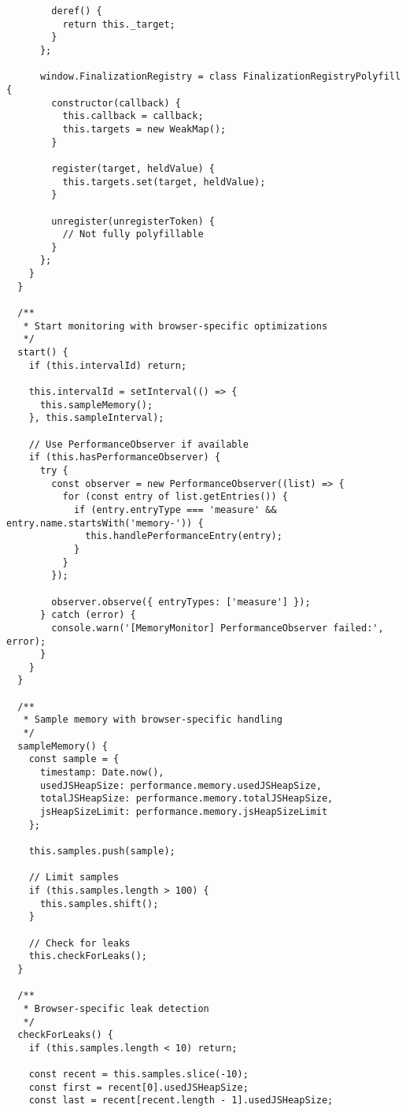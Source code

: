 \documentclass[11pt]{article}
\begin{document}
\begin{verbatim}
        deref() {
          return this._target;
        }
      };
      
      window.FinalizationRegistry = class FinalizationRegistryPolyfill {
        constructor(callback) {
          this.callback = callback;
          this.targets = new WeakMap();
        }
        
        register(target, heldValue) {
          this.targets.set(target, heldValue);
        }
        
        unregister(unregisterToken) {
          // Not fully polyfillable
        }
      };
    }
  }
  
  /**
   * Start monitoring with browser-specific optimizations
   */
  start() {
    if (this.intervalId) return;
    
    this.intervalId = setInterval(() => {
      this.sampleMemory();
    }, this.sampleInterval);
    
    // Use PerformanceObserver if available
    if (this.hasPerformanceObserver) {
      try {
        const observer = new PerformanceObserver((list) => {
          for (const entry of list.getEntries()) {
            if (entry.entryType === 'measure' && entry.name.startsWith('memory-')) {
              this.handlePerformanceEntry(entry);
            }
          }
        });
        
        observer.observe({ entryTypes: ['measure'] });
      } catch (error) {
        console.warn('[MemoryMonitor] PerformanceObserver failed:', error);
      }
    }
  }
  
  /**
   * Sample memory with browser-specific handling
   */
  sampleMemory() {
    const sample = {
      timestamp: Date.now(),
      usedJSHeapSize: performance.memory.usedJSHeapSize,
      totalJSHeapSize: performance.memory.totalJSHeapSize,
      jsHeapSizeLimit: performance.memory.jsHeapSizeLimit
    };
    
    this.samples.push(sample);
    
    // Limit samples
    if (this.samples.length > 100) {
      this.samples.shift();
    }
    
    // Check for leaks
    this.checkForLeaks();
  }
  
  /**
   * Browser-specific leak detection
   */
  checkForLeaks() {
    if (this.samples.length < 10) return;
    
    const recent = this.samples.slice(-10);
    const first = recent[0].usedJSHeapSize;
    const last = recent[recent.length - 1].usedJSHeapSize;
    

\end{verbatim}
\end{document}
